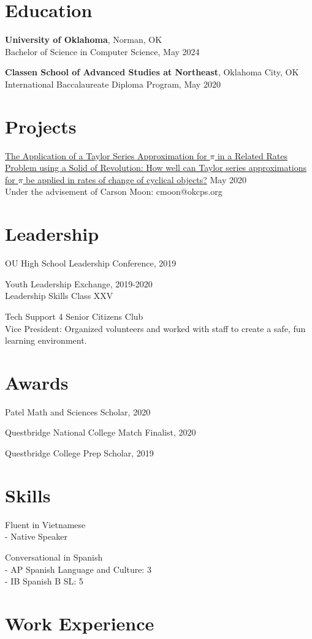 \documentclass[12pt]{article}
\begin{document}
\section{Education}
\textbf{University of Oklahoma}, Norman, OK \\
Bachelor of Science in Computer Science, May 2024

\textbf{Classen School of Advanced Studies at Northeast}, Oklahoma City, OK \\
International Baccalaureate Diploma Program, May 2020

\section{Projects}
\href{https://github.com/tttnguyen729/ee}{The Application of a Taylor Series Approximation for \(\pi\) in a Related Rates Problem using a Solid of Revolution: How well can Taylor series approximations for \(\pi\) be applied in rates of change of cyclical objects?} May 2020 \\
Under the advisement of Carson Moon: cmoon@okcps.org

\section{Leadership}
OU High School Leadership Conference, 2019

Youth Leadership Exchange, 2019-2020 \\ 
Leadership Skills Class XXV

Tech Support 4 Senior Citizens Club \\
Vice President: Organized volunteers and worked with staff to create a safe, fun learning environment.

\section{Awards}
Patel Math and Sciences Scholar, 2020

Questbridge National College Match Finalist, 2020

Questbridge College Prep Scholar, 2019

\section{Skills}
Fluent in Vietnamese \\
- Native Speaker

Conversational in Spanish \\ 
- AP Spanish Language and Culture: 3 \\
- IB Spanish B SL: 5

\section{Work Experience}
\end{document}
